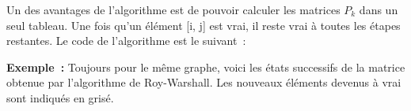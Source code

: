 			Un des avantages de l'algorithme est de pouvoir calculer les matrices 
			$P_k$ dans un seul tableau. Une fois qu'un élément [i, j] est vrai, 
			il reste vrai à toutes les étapes restantes. Le code de l'algorithme
			est le suivant~:
			

			\textbf{Exemple~:} Toujours pour le même graphe, voici les états 
			successifs de la matrice obtenue par l'algorithme de Roy-Warshall. 
			Les nouveaux éléments devenus à vrai sont indiqués en grisé.

